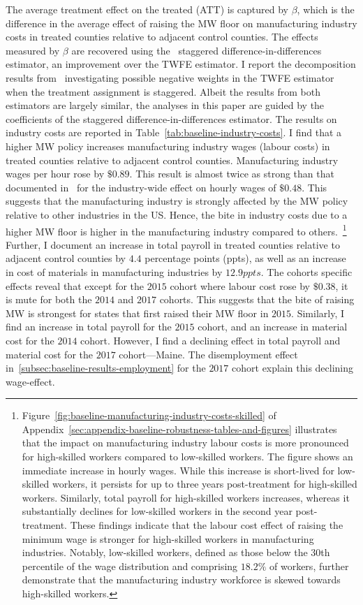 \documentclass[12pt, english]{article}
\begin{document}
    The average treatment effect on the treated (ATT) is captured by $\beta$, which is the difference in the average effect of raising the MW floor on manufacturing industry costs in treated counties relative to adjacent control counties. The effects measured by $\beta$ are recovered using the~\cite{sun2021estimating} staggered difference-in-differences estimator, an improvement over the TWFE estimator. I report the decomposition results from~\cite{de2020two} investigating possible negative weights in the TWFE estimator when the treatment assignment is staggered. Albeit the results from both estimators are largely similar, the analyses in this paper are guided by the coefficients of the staggered difference-in-differences estimator. The results on industry costs are reported in Table~\ref{tab:baseline-industry-costs}. I find that a higher MW policy increases manufacturing industry wages (labour costs) in treated counties relative to adjacent control counties. Manufacturing industry wages per hour rose by $\$0.89$. This result is almost twice as strong than that documented in~\cite{gopalan2021state} for the industry-wide effect on hourly wages of $\$0.48$. This suggests that the manufacturing industry is strongly affected by the MW policy relative to other industries in the US. Hence, the bite in industry costs due to a higher MW floor is higher in the manufacturing industry compared to others.~\footnote{\tiny Figure~\ref{fig:baseline-manufacturing-industry-costs-skilled} of Appendix~\ref{sec:appendix-baseline-robustness-tables-and-figures} illustrates that the impact on manufacturing industry labour costs is more pronounced for high-skilled workers compared to low-skilled workers. The figure shows an immediate increase in hourly wages. While this increase is short-lived for low-skilled workers, it persists for up to three years post-treatment for high-skilled workers. Similarly, total payroll for high-skilled workers increases, whereas it substantially declines for low-skilled workers in the second year post-treatment. These findings indicate that the labour cost effect of raising the minimum wage is stronger for high-skilled workers in manufacturing industries. Notably, low-skilled workers, defined as those below the 30th percentile of the wage distribution and comprising $18.2\%$ of workers, further demonstrate that the manufacturing industry workforce is skewed towards high-skilled workers.} Further, I document an increase in total payroll in treated counties relative to adjacent control counties by $4.4$ percentage points (ppts), as well as an increase in cost of materials in manufacturing industries by $12.9ppts$. The cohorts specific effects reveal that except for the $2015$ cohort where labour cost rose by $\$0.38$, it is mute for both the $2014$ and $2017$ cohorts. This suggests that the bite of raising MW is strongest for states that first raised their MW floor in $2015$. Similarly, I find an increase in total payroll for the $2015$ cohort, and an increase in material cost for the $2014$ cohort. However, I find a declining effect in total payroll and material cost for the $2017$ cohort---Maine. The disemployment effect in~\ref{subsec:baseline-results-employment} for the $2017$ cohort explain this declining wage-effect.
    
\end{document}
